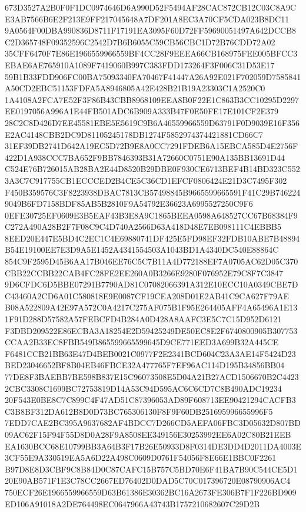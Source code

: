 \documentclass[UTF8,fontset=fandol,zihao=-4,a4paper]{ctexart}
\begin{document}
{{673D3527A2B0F0F1DC0974646D6A990D52F5494AF28CAC872CB12C03C8A9CE3AB7566B6E2F213E9FF217045648A7DF201A8EC3A70CF5CDA023B8DC11
9A0564F00DBA990836D8711F17191EA3095F60D72FF59690051497A642DCCB8C2D365748F09352596C2542D7B6B6055C59CB56CBC1D72B76CDD72A02
35CFF6470F7E86E1966559966559BF4CC28F9EEEA66CB168975FEE005BFCC3EBAE6AE765910A1089F7419060B997C383FDD173264F3F006C31D53E17
59B1B33FDD906FC00BA75093340FA70467F41447A26A92E021F702059D7585841A50CD2EBC51153FDFA5A8946805A42E428B21B19A23303C1A2520C0
1A4108A2FCA7E52F3F86B43CBB8968109EEA8B0F22E1C863B3CC10295D2297EE0197056A996A1E44FB501ADC6B909A333B47F0E50FE17E101CF2E379
28C2C8D426D7EE45581EBE5E5619C9B6A46559966559D63791F0D9039E16F356E2AC4148CBB2DC9D81105245178DB1274F5852974374421881CD66C7
31EF39DB2741D642A19EC5D72B9E8A0CC7291FDEB6A15EBCA585D4E2756F422D1A938CCC7BA652F9BB7846393B31A72660C0751E90A135BB13691D44
C524E76B726015AB28BA2E44D8520B29DBE0F930CE6713BEF4B14BD323C5523A3C7C917755CB1ECCCED2B4CE5C36CD1EFCF0806424E21D3C7495F302
F450B359576C3F8223938DBAC7813CB57498845B9665599665591F41C29B7462249049B6FD7158BDF85AB5B2810F9A54792E36623A6995527250C9F6
0EFE30725EF0609E3B5EAF43B3E8A9C1865BEEA0598A648527CC67B68384F9C272A490A28B2F7F08C9C4D740A2566D63A418D48E7EB098111C4EBBB5
8EED20E447E5BD4C2EC1C4E69880741DF425E5FD98EF32FDB10ABE7B48894B54E19100EE7E3D9A5E1452A4341554503A1043BD1A4340DC540E88864C
854C9F2595D45B6AA17B046EE76C5C7B11A4D772188EF7A0705AC62D05C370CBB22CCBB22CAB4FC28FE2EE260A0B3266E9280F076952E79C8F7C3847
9D6CFDC6D5BBE07291B7790AD81C07082066391A312E10ECC10A0349CBE7DC43460A2CD6A01C580818E9E0087CF19CEA208D01E2AB41C9CA627F79AE
B08A522809A42E97A572C0A4217C275AF075B1F95E264405AFF4A65496A1E131F91D288D57582A57FEBCFD4B284A0D428A8AAFC3E5C7C15D952D6121
F3DBD209522E86ECBA3A18254E2D59425249DE50EC8E2F6740800905B307753CCAA2B33EC8FBB549B865599665599645D9CE771EED3A699B32A445CE
F6481CCB21BB63E47D4BEB0021C0977F2E2341BCD604C23A3AE14F5424D23BED23046652BF8B04EB46FBCE32A477765F7EF96AC114D195B34856BB04
77DE8F3BAEBB7BE598B837E15C96073508E5D04A21B27ACD1506670B2C44232CBC3308C1699BC72753819D14A53C94D595AC6C6CD7C8B490ADC19234
20F543E0BE8C7C899C4F47AD51C87396053AD89F608713EE90421294CACFB3C3B8BF312DA612B8D0D73BC765306130F8F9F60DB251695996655996F5
7EDD7CAE2BC395A9637682AF4BDCC7D266CD5AEFA06FBC3D05632D807BD09AC62F15F94F55D8D0A28F9A8508EE349156E30253992EE6A02C80B21EEB
EA1630BCC68E10799BB3A64B3F17B26E50933D8F0314DE3DD4D2011DA4003E3CF55E9A330519EA5A6D22A498C0609D0761F54056F8E66E1BBC0F2261
B97D8E8D3CBF9C8B84D0C87CAFC15B757C5BD70E6F41BA7B90C544CE5D120E90AB571F1E3C78CC2667ED76402D0DAD5C70C017396720E08790906AC4
750ECF26E1966559966559D63B61386E30362BC16A2673FE306B7F1F226BD909ED106A91018A2DE764498EC0647966A43743B1757210682607C29D2B
}}
\end{document}
